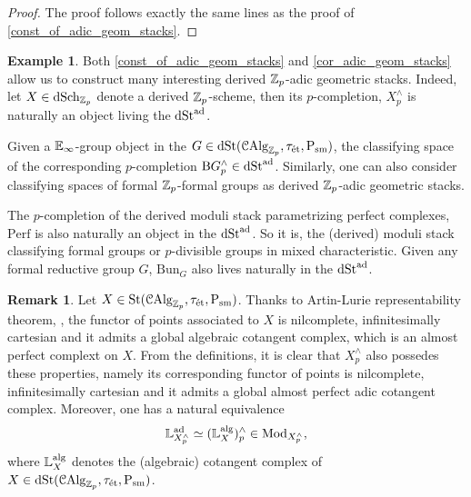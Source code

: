 \documentclass[10pt,a4paper]{amsart}
\numberwithin{equation}{subsection}
\theoremstyle{definition}
\newtheorem{remark}[theorem]{Remark}
\newtheorem{example}[theorem]{Example}
\begin{document}
\begin{proof}
    The proof follows exactly the same lines as the proof of \cref{const_of_adic_geom_stacks}.
\end{proof}

\begin{example}
    Both \cref{const_of_adic_geom_stacks} and \cref{cor_adic_geom_stacks} allow us to construct many interesting derived $\mathbb Z_p$-adic geometric stacks. Indeed,
    let $X \in \mathrm{dSch}_{\mathbb Z_p}$ denote a derived $\mathbb Z_p$-scheme, then its $p$-completion, $X^\wedge_p$ is naturally an object living the \infcat $\mathrm{dSt}^{\mathrm{ad}}$. 

    Given a $\mathbb E_\infty$-group object in the \infcat $G \in \mathrm{dSt}(\mathcal{C}\mathrm{Alg}_{\mathbb Z_p}, \tau_{\text{\'et}}, \mathrm P_{\mathrm{sm}})$, the classifying space of the corresponding $p$-completion $\mathrm{B} G^\wedge_p \in \mathrm{dSt}^{\mathrm{ad}}$. Similarly, one can also consider classifying spaces of formal $\mathbb Z_p$-formal groups
    as derived $\mathbb Z_p$-adic geometric stacks.
    
    The $p$-completion of the derived moduli stack parametrizing perfect complexes, $\mathrm{Perf}$ is also naturally an object in the \infcat $\mathrm{dSt}^{\mathrm{ad}}$. So it is, the (derived) moduli stack classifying formal groups or $p$-divisible groups in mixed characteristic.
    Given any formal reductive group $G$, $\mathrm{Bun}_G$ also lives naturally in the \infcat $\mathrm{dSt}^{\mathrm{ad}}$.
\end{example}

\begin{remark}
    Let $X \in \mathrm{St}(\mathcal{C}\mathrm{Alg}_{\mathbb Z_p}, \tau_{\text{\'et}}, \mathrm P_{\mathrm{sm}})$. Thanks to Artin-Lurie representability theorem, \cite[Theorem 3.1.2]{lurie2012dag}, the functor of points associated to $X$ is nilcomplete, infinitesimally cartesian
    and it admits a global algebraic cotangent complex, which is an almost perfect complext on $X$. From the definitions, it is clear that $X^\wedge_p$ also possedes these properties, namely its corresponding functor of points is nilcomplete, infinitesimally cartesian and it admits a global almost perfect adic cotangent complex. Moreover,
    one has a natural equivalence
        \[
                \mathbb{L}^{\mathrm{ad}}_{X^\wedge_p} \simeq (\mathbb L^{\mathrm{alg}}_X  )^\wedge_p \in \mathrm{Mod}_{X^\wedge_p},
        \]
    where $\mathbb L^{\mathrm{alg}}_X$ denotes the (algebraic) cotangent complex of $X \in \mathrm{dSt}(\mathcal{C}\mathrm{Alg}_{\mathbb Z_p}, \tau_{\text{\'et}}, \mathrm P_{\mathrm{sm}})$.
\end{remark}

\end{document}
